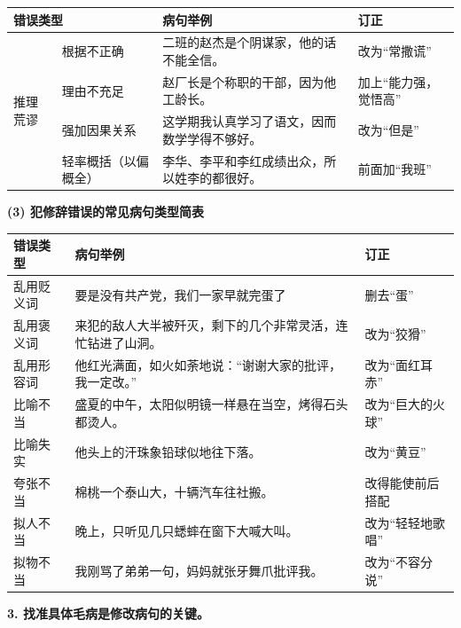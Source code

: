 \vspace{2em}
\noindent
\begin{tabular}{|lp{5em}|p{10em}|p{5em}|}
	\hline
	\multicolumn{2}{|l|}{错误类型}                               & 病句举例                   & 订正          \\ \hline
	\multicolumn{1}{|l|}{\multirow{4}{*}{推理荒谬}} & 根据不正确      & 二班的赵杰是个阴谋家，他的话不能全信。    & 改为“常撒谎”     \\ \cline{2-4} 
	\multicolumn{1}{|l|}{}                      & 理由不充足      & 赵厂长是个称职的干部，因为他工龄长。     & 加上“能力强，觉悟高” \\ \cline{2-4} 
	\multicolumn{1}{|l|}{}                      & 强加因果关系     & 这学期我认真学习了语文，因而数学学得不够好。 & 改为“但是”      \\ \cline{2-4} 
	\multicolumn{1}{|l|}{}                      & 轻率概括（以偏概全） & 李华、李平和李红成绩出众，所以姓李的都很好。 & 前面加“我班”     \\ \hline
\end{tabular}

\textbf{(3) 犯修辞错误的常见病句类型简表}

\noindent
\begin{tabular}{|l|p{12em}|p{6em}|}
	\hline
	错误类型  & 病句举例                          & 订正        \\ \hline
	乱用贬义词 & 要是没有共产党，我们一家早就完蛋了             & 删去“蛋”     \\ \hline
	乱用褒义词 & 来犯的敌人大半被歼灭，剩下的几个非常灵活，连忙钻进了山洞。 & 改为“狡猾”    \\ \hline
	乱用形容词 & 他红光满面，如火如荼地说：“谢谢大家的批评，我一定改。”  & 改为“面红耳赤”  \\ \hline
	比喻不当  & 盛夏的中午，太阳似明镜一样悬在当空，烤得石头都烫人。    & 改为“巨大的火球” \\ \hline
	比喻失实  & 他头上的汗珠象铅球似地往下落。               & 改为“黄豆”    \\ \hline
	夸张不当  & 棉桃一个泰山大，十辆汽车往社搬。              & 改得能使前后搭配  \\ \hline
	拟人不当  & 晚上，只听见几只蟋蟀在窗下大喊大叫。            & 改为“轻轻地歌唱” \\ \hline
	拟物不当  & 我刚骂了弟弟一句，妈妈就张牙舞爪批评我。          & 改为“不容分说”  \\ \hline
\end{tabular}

\vspace{2em}
\textbf{3. 找准具体毛病是修改病句的关键。}

